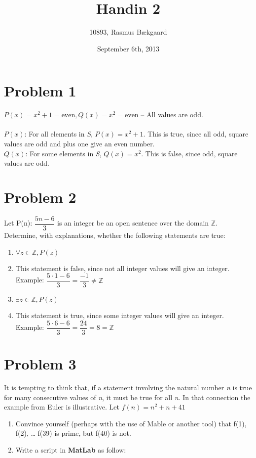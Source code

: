 \documentclass[english,10pt,a4paper]{article}
\title{Handin 2}
\author{10893, Rasmus Bækgaard}
\date{September 6th, 2013}
\begin{document}
\maketitle

\section*{Problem 1}
$P(x) = x^2 + 1 = \text{even}, Q(x)=x^2 = \text{even}$ -- All values are odd.
\\
\\
$P(x)$: For all elements in \textit{S}, $P(x) = x^2 +1$. 
This is true, since all odd, square values are odd and plus one give an even number.
\\
$Q(x)$: For some elements in \textit{S}, $Q(x)=x^2$. This is false, since odd, square values are odd.


\section*{Problem 2}
Let P(n): $\dfrac{5n-6}{3}$ is an integer be an open sentence over the domain $\mathbb{Z}$. Determine, with explanations, whether the following statements are true:
\begin{enumerate}[a]
\item $\forall z \in \mathbb{Z}, P(z)$
\item[] This statement is false, since not all integer values will give an integer. 
Example: $\dfrac{5\cdot 1-6}{3}=\dfrac{-1}{3} \not = \mathbb{Z}$
\item $\exists z \in \mathbb{Z}, P(z)$
\item[] This statement is true, since some integer values will give an integer. 
Example: $\dfrac{5\cdot 6 - 6}{3}=\dfrac{24}{3} = 8  = \mathbb{Z}$
\end{enumerate}



\section*{Problem 3}
It is tempting to think that, if a statement involving the natural number \textit{n} is true for many consecutive values of \textit{n}, it must be true for all \textit{n}. 
In that connection the example from Euler is illustrative.
 Let $f(n) = n^2 + n + 41$ 
\begin{enumerate}[a]

\item Convince yourself (perhaps with the use of Mable or another tool) that f(1), f(2), … f(39) is prime, but f(40) is not. 
\item[] Write a script in \textbf{MatLab} as follow:
\end{enumerate}
\end{document}
